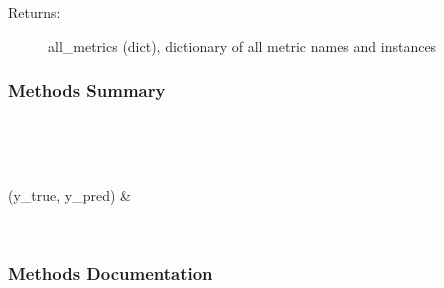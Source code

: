\documentclass[letterpaper,10pt,english]{sphinxmanual}
\begin{document}
\begin{fulllineitems}
\begin{description}
\begin{description}
\begin{description}
\item[{Returns:}] \leavevmode
all\_metrics (dict), dictionary of all metric names and instances

\end{description}

\end{description}

\end{description}
\subsubsection*{Methods Summary}


\begin{savenotes}\sphinxatlongtablestart\begin{longtable}[c]{}
\hline

\endfirsthead

%
{}\\
\hline

\endhead

\hline
{}\\
\endfoot

\endlastfoot

{\hyperref[\detokenize{api/mastml.metrics.Metrics:mastml.metrics.Metrics.evaluate}]{}}(y\_true, y\_pred)
&

\\
\hline
\end{longtable}\sphinxatlongtableend\end{savenotes}
\subsubsection*{Methods Documentation}

\begin{fulllineitems}
\label{\detokenize{api/mastml.metrics.Metrics:mastml.metrics.Metrics.evaluate}}
\end{fulllineitems}


\end{fulllineitems}
\end{document}

